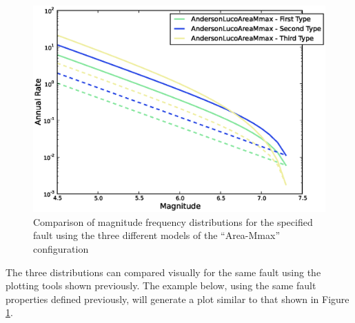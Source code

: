 \begin{figure}[htb]
  \centering
      \includegraphics[trim=5mm 5mm 5mm 5mm, clip, width=12cm]{./figures/anderson_luco_mmax_mfds.eps}
  \caption{Comparison of magnitude frequency distributions for the specified fault using the three different models of the \cite{AndersonLuco1983} ``Area-Mmax'' configuration}
  \label{fig:anderson_luco_area_mmax}
\end{figure}

The three distributions can compared visually for the same fault using the plotting tools shown previously. The example below, using the same fault properties defined previously, will generate a plot similar to that shown in Figure \ref{fig:anderson_luco_area_mmax}.

